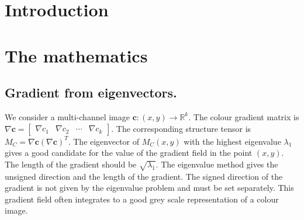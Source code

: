 \documentclass[conference]{IEEEtran}
\begin{document}
\title{}



\IEEEoverridecommandlockouts
{}
\maketitle
\IEEEpubidadjcol


\begin{abstract}

\end{abstract}


\section{Introduction}


\section{The mathematics}
\subsection{Gradient from eigenvectors.}
We consider a multi-channel image $\mathbf{c}:(x,y)\to\mathbb R^k$.
%
The colour gradient matrix is $\nabla\mathbf{c}=\begin{bmatrix}\nabla c_1&\nabla c_2&\cdots&\nabla c_k\end{bmatrix}$.
%
The corresponding structure tensor is $M_C=\nabla\mathbf{c}(\nabla\mathbf{c})^T$.
%
The eigenvector of $M_C(x,y)$ with the highest eigenvalue $\lambda_1$ gives a good candidate for the value of the gradient field in the point $(x,y)$.
%
The length of the gradient should be $\sqrt{\lambda_1}$.
%
The eigenvalue method gives the unsigned direction and the length of the gradient.
%
The signed direction of the gradient is not given by the eigenvalue problem and must be set separately.
%
This gradient field often integrates to a good grey scale representation of a colour image.
%
\end{document}
